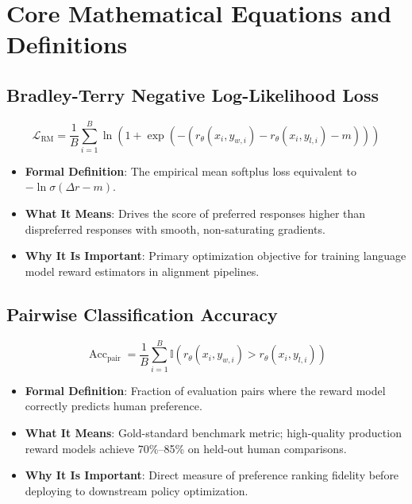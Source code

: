 \documentclass[11pt,a4paper]{article}
\theoremstyle{definition}
\begin{document}
\section{Core Mathematical Equations and Definitions}

\subsection{Bradley-Terry Negative Log-Likelihood Loss}
{\boldmath
\begin{equation}
\mathcal{L}_{\text{RM}} = \frac{1}{B}\sum_{i=1}^B \ln\left( 1 + \exp\left( -(r_\theta(x_i, y_{w, i}) - r_\theta(x_i, y_{l, i}) - m) \right) \right)
\end{equation}
}
\begin{itemize}
    \item \textbf{Formal Definition}: The empirical mean softplus loss equivalent to $-\ln \sigma(\Delta r - m)$.
    \item \textbf{What It Means}: Drives the score of preferred responses higher than dispreferred responses with smooth, non-saturating gradients.
    \item \textbf{Why It Is Important}: Primary optimization objective for training language model reward estimators in alignment pipelines.
\end{itemize}

\subsection{Pairwise Classification Accuracy}
{\boldmath
\begin{equation}
\operatorname{Acc}_{\text{pair}} = \frac{1}{B}\sum_{i=1}^B \mathbb{I}\left( r_\theta(x_i, y_{w, i}) > r_\theta(x_i, y_{l, i}) \right)
\end{equation}
}
\begin{itemize}
    \item \textbf{Formal Definition}: Fraction of evaluation pairs where the reward model correctly predicts human preference.
    \item \textbf{What It Means}: Gold-standard benchmark metric; high-quality production reward models achieve 70\%--85\% on held-out human comparisons.
    \item \textbf{Why It Is Important}: Direct measure of preference ranking fidelity before deploying to downstream policy optimization.
\end{itemize}
\end{document}
